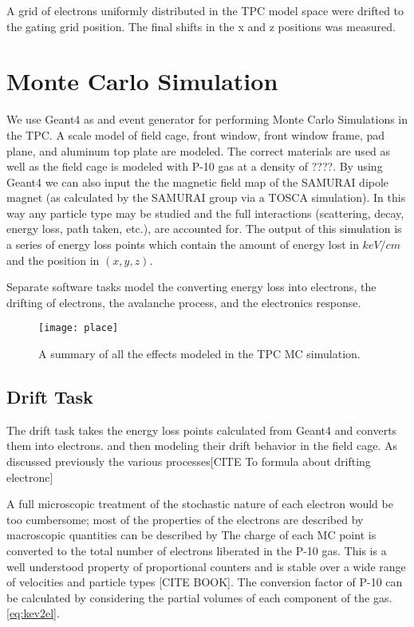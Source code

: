 A grid of electrons uniformly distributed in the TPC model space were drifted to the gating grid position. The final shifts in the x and z positions was measured. 


\section{Monte Carlo Simulation}
We use Geant4 as and event generator for performing Monte Carlo Simulations in the TPC. A scale model of field cage, front window, front window frame, pad plane, and aluminum top plate are modeled. The correct materials are used as well as the field cage is modeled with P-10 gas at a density of ????. By using Geant4 we can also input the the magnetic field map of the SAMURAI dipole magnet (as calculated by the SAMURAI group via a TOSCA simulation).  In this way any particle type may be studied and the full interactions (scattering, decay, energy loss, path taken, etc.), are accounted for. The output of this simulation is a series of energy loss points which contain the amount of energy lost in $keV/cm$ and the position in $(x,y,z)$.

Separate software tasks model the converting energy loss into electrons, the drifting of electrons, the avalanche process, and the electronics response.

\begin{figure}
\texttt{[image: place]}
\caption{A summary of all the effects modeled in the TPC MC simulation.}
\label{fig:place}
\end{figure}

\subsection{Drift Task}
The drift task takes the energy loss points calculated from Geant4 and converts them into electrons.  and then modeling their drift behavior in the field cage. As discussed previously the various processes[CITE To formula about drifting electronc]


 A full microscopic treatment of the stochastic nature of each electron would be too cumbersome; most of the properties of the electrons are described by macroscopic quantities can be described by 
The charge of each MC point is converted to the total number of electrons liberated in the P-10 gas. This is a well understood property of proportional counters and is stable over a wide range of velocities and particle types [CITE BOOK]. The conversion factor of P-10 can be calculated by considering the partial volumes of each component of the gas.  \ref{eq:kev2el}.

